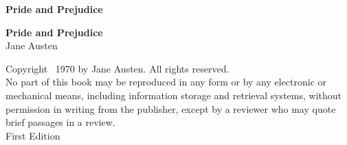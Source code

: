 \documentclass[12pt,openright]{book}
\renewcommand{\normalsize}{\fontsize{10.5pt}{14pt}\selectfont}
\begin{document}
\frontmatter
\pagestyle{plain}

%

\cleardoublepage
\thispagestyle{empty}
\vspace*{\fill}
\begin{center}
{\Huge\textbf{Pride and Prejudice}}
\end{center}
\vspace*{\fill}
\cleardoublepage

%

\thispagestyle{empty}
\vspace*{2in}
\begin{center}
{\Huge\textbf{Pride and Prejudice}}\\[1em]
{\large Jane Austen}
\end{center}
\vfill
\clearpage

%

\thispagestyle{empty}
\fontsize{8pt}{10pt}\selectfont
\setlength{\parindent}{0pt}
\noindent\begin{flushleft}
Copyright \textcopyright\ 1970 by Jane Austen. All rights reserved.\\[0.5em]
No part of this book may be reproduced in any form or by any electronic or mechanical means, including information storage and retrieval systems, without permission in writing from the publisher, except by a reviewer who may quote brief passages in a review.\\[0.5em]
First Edition\\[0.5em]
\end{flushleft}
\normalsize
\clearpage
\end{document}
